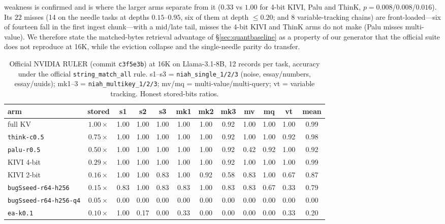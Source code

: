 \documentclass[11pt]{article}
\begin{document}
weakness is confirmed and is where the larger arms separate from it ($0.33$ vs
$1.00$ for 4-bit KIVI, Palu and ThinK, $p=0.008$/$0.008$/$0.016$). Its $22$ misses (14 on the needle tasks at depths $0.15$--$0.95$, six of them at
depth $\le0.20$; and 8 variable-tracking chains) are front-loaded---six of
fourteen fall in the first ingest chunk---with a mid/late tail, misses the
4-bit KIVI and ThinK arms do not make (Palu misses multi-value). We therefore state the matched-bytes
retrieval advantage of \S\ref{sec:quantbaseline} as a property of our generator
that the official suite does not reproduce at 16K, while the eviction collapse
and the single-needle parity do transfer.

\begin{table}[htbp]
\centering
\caption{Official NVIDIA RULER (commit \texttt{c3f5e3b}) at 16K on Llama-3.1-8B,
12 records per task, accuracy under the official \texttt{string\_match\_all}
rule. s1--s3 = \texttt{niah\_single\_1/2/3} (noise, essay/numbers, essay/uuids);
mk1--3 = \texttt{niah\_multikey\_1/2/3}; mv/mq = multi-value/multi-query; vt =
variable tracking. Honest stored-bits ratios.}
\label{tab:official}
\small
\begin{tabular}{lcccccccccc|c}
\toprule
arm & stored & s1 & s2 & s3 & mk1 & mk2 & mk3 & mv & mq & vt & mean \\
\midrule
full KV & $1.00\times$ & 1.00 & 1.00 & 1.00 & 1.00 & 1.00 & 0.92 & 1.00 & 1.00 & 1.00 & 0.99 \\
\texttt{think-c0.5} & $0.75\times$ & 1.00 & 1.00 & 1.00 & 1.00 & 1.00 & 0.92 & 1.00 & 1.00 & 0.92 & 0.98 \\
\texttt{palu-r0.5} & $0.50\times$ & 1.00 & 1.00 & 1.00 & 1.00 & 1.00 & 0.92 & 0.42 & 0.92 & 1.00 & 0.92 \\
KIVI 4-bit & $0.29\times$ & 1.00 & 1.00 & 1.00 & 1.00 & 1.00 & 0.92 & 1.00 & 1.00 & 1.00 & 0.99 \\
KIVI 2-bit & $0.16\times$ & 1.00 & 1.00 & 0.83 & 1.00 & 0.92 & 0.58 & 0.83 & 1.00 & 0.67 & 0.87 \\
\texttt{bugSseed-r64-h256} & $0.15\times$ & 0.83 & 1.00 & 0.83 & 0.83 & 1.00 & 0.83 & 0.83 & 0.67 & 0.33 & 0.79 \\
\texttt{bugSseed-r64-h256-q4} & $0.05\times$ & 0.00 & 0.00 & 0.00 & 0.00 & 0.00 & 0.00 & 0.00 & 0.00 & 0.00 & 0.00 \\
\texttt{ea-k0.1} & $0.10\times$ & 1.00 & 0.17 & 0.00 & 0.33 & 0.00 & 0.00 & 0.00 & 0.00 & 0.33 & 0.20 \\
\bottomrule
\end{tabular}
\end{table}
\end{document}
